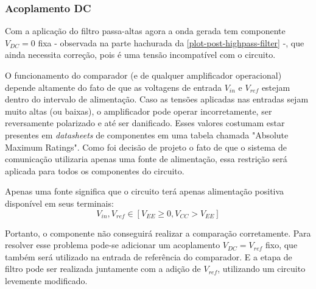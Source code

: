 	\subsubsection{Acoplamento DC}\label{section:dc-bias}
	Com a aplicação do filtro passa-altas agora a onda gerada tem componente $V_{DC} = 0$ fixa - observada na parte hachurada da \autoref{plot-post-highpass-filter} -, que ainda necessita correção, pois é uma tensão incompatível com o circuito.
	
	O funcionamento do comparador (e de qualquer amplificador operacional) depende altamente do fato de que as voltagens de entrada $V_{in}$ e $V_{ref}$ estejam dentro do intervalo de alimentação. Caso as tensões aplicadas nas entradas sejam muito altas (ou baixas), o amplificador pode operar incorretamente, ser reversamente polarizado e até ser danificado. Esses valores costumam estar presentes em \textit{datasheets} de componentes em uma tabela chamada "Absolute Maximum Ratings". Como foi decisão de projeto o fato de que o sistema de comunicação utilizaria apenas uma fonte de alimentação, essa restrição será aplicada para todos os componentes do circuito.
	
	Apenas uma fonte significa que o circuito terá apenas alimentação positiva disponível em seus terminais: 
	\begin{equation}
	V_{in}, V_{ref} \in [V_{EE} \geq 0, V_{CC} > V_{EE}]
	\end{equation}
	
	Portanto, o componente não conseguirá realizar a comparação corretamente. Para resolver esse problema pode-se adicionar um acoplamento $V_{DC} = V_{ref}$ fixo, que também será utilizado na entrada de referência do comparador. E a etapa de filtro pode ser realizada juntamente com a adição de $V_{ref}$, utilizando um circuito levemente modificado.
	

